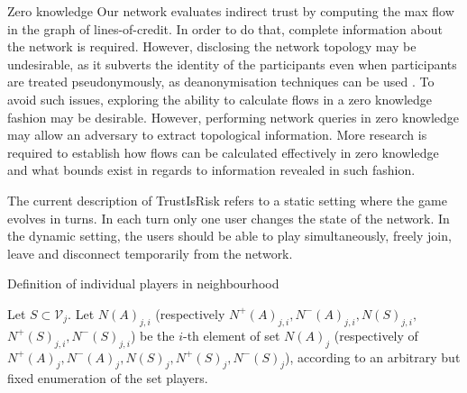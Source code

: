 Zero knowledge
     Our network evaluates indirect trust by computing the max flow in the graph of lines-of-credit. In order to do that,
     complete information about the network is required. However, disclosing the network topology may be undesirable, as it
     subverts the identity of the participants even when participants are treated pseudonymously, as deanonymisation
     techniques can be used \cite{deanonymisation}. To avoid such issues, exploring the ability to calculate flows in a zero
     knowledge fashion may be desirable. However, performing network queries in zero knowledge may allow an adversary to
     extract topological information. More research is required to establish how flows can be calculated effectively in zero
     knowledge and what bounds exist in regards to information revealed in such fashion.

     The current description of TrustIsRisk refers to a static setting where the game evolves in turns. In each turn only one
     user changes the state of the network. In the dynamic setting, the users should be able to play simultaneously, freely
     join, leave and disconnect temporarily from the network.


Definition of individual players in neighbourhood
           \item Let $S \subset \mathcal{V}_j$. Let $N\left(A\right)_{j,i}$ (respectively $N^{+}\left(A\right)_{j,i},
              N^{-}\left(A\right)_{j,i}, N\left(S\right)_{j,i},$ $N^{+}\left(S\right)_{j,i}, N^{-}\left(S\right)_{j,i}$) be
              the $i$-th element of set $N\left(A\right)_j$ (respectively of $N^{+}\left(A\right)_j,  N^{-}\left(A\right)_j,
              N\left(S\right)_j, N^{+}\left(S\right)_j, N^{-}\left(S\right)_j$), according to an arbitrary but fixed
              enumeration of the set players.

